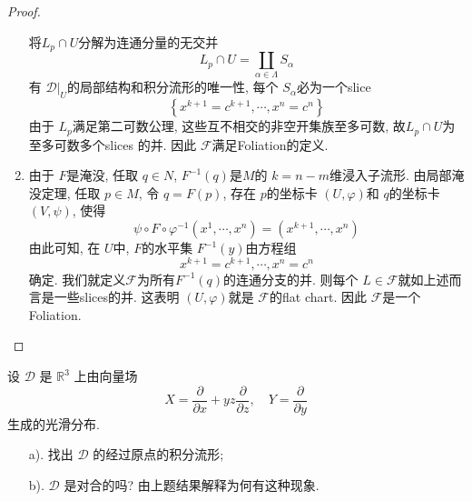 \documentclass[../main.tex]{subfiles}
\begin{document}
\begin{proof}
\begin{enumerate}
        将\(  L_{p}\cap U  \)分解为连通分量的无交并
        \[
        L_{p}\cap U= \coprod  _{\alpha \in  \Lambda }S_{\alpha }
        \]      有 \( \mathcal{D}|_{U}  \)的局部结构和积分流形的唯一性, 每个 \(  S_{\alpha }  \)必为一个slice
        \[
        \left\{ x^{k+ 1}= c^{k+ 1},\cdots ,x^{n}= c^{n} \right\}
        \]  由于 \(  L_{p}  \)满足第二可数公理, 这些互不相交的非空开集族至多可数, 故\(  L_{p}\cap U  \)为至多可数多个slices 的并. 因此 \(  \mathcal{F}  \)满足Foliation的定义.   
        \item   由于 \(  F  \)是淹没, 任取 \(  q\in N  \), \(  F^{-1} \left( q \right)   \)是\(  M  \)的 \(  k= n-m  \)维浸入子流形. 由局部淹没定理, 任取 \(  p\in M  \), 令 \(  q= F\left( p \right)   \), 存在 \(  p  \)的坐标卡 \(  \left( U, \varphi  \right)   \)和 \(  q  \)的坐标卡 \(  \left( V,\psi  \right)   \), 使得
        \[
        \psi \circ F\circ  \varphi ^{-1} \left( x^{1},\cdots ,x^{n} \right)= \left(x^{k+ 1},\cdots ,x^{n}\right) 
        \]      由此可知, 在 \(  U  \)中,  \(  F  \)的水平集 \(  F^{-1} \left( y \right)   \)由方程组
        \[
        x^{k+ 1}= c^{k+ 1},\cdots ,x^{n}= c^{n}
        \]确定. 我们就定义\(  \mathcal{F}  \)为所有\(  F^{-1} \left( q \right)   \)的连通分支的并. 则每个 \(  L\in \mathcal{F}  \)就如上述而言是一些slices的并. 这表明 \(  \left( U, \varphi  \right)   \)就是 \(  \mathcal{F}  \)的flat chart. 因此 \(  \mathcal{F}  \)是一个Foliation.                
    \end{enumerate}
    
\end{proof}
\begin{exercise}{}{}
设 $\mathcal{D}$ 是 $\mathbb{R}^3$ 上由向量场
\[
X = \frac{\partial}{\partial x} + yz\frac{\partial}{\partial z}, \quad Y = \frac{\partial}{\partial y}
\]
生成的光滑分布.
\begin{enumerate}
\item[a).] 找出 $\mathcal{D}$ 的经过原点的积分流形;
\item[b).] $\mathcal{D}$ 是对合的吗? 由上题结果解释为何有这种现象.
\end{enumerate}
\end{exercise}
\end{document}
